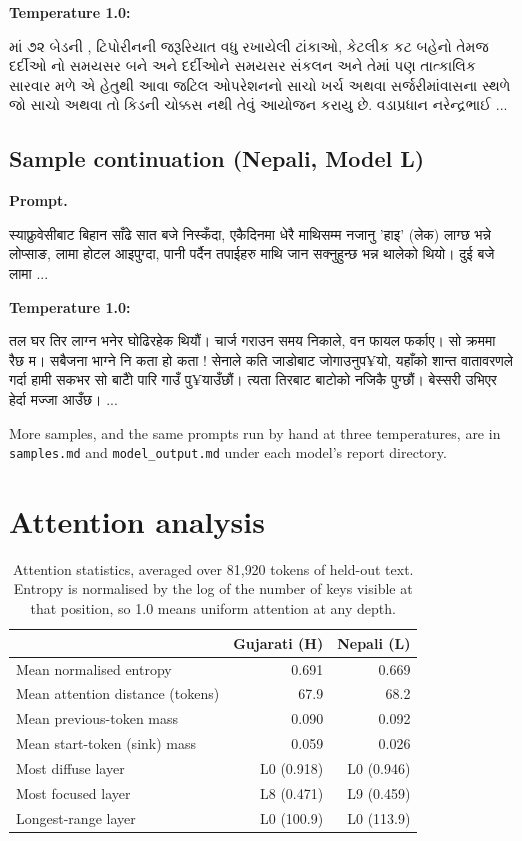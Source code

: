\documentclass[11pt,a4paper]{article}
\newcommand{\gujaratitext}[1]{{\gujaratifont #1}}
\newcommand{\nepalitext}[1]{{\nepalifont #1}}
\newcommand{\fallbacktext}[1]{{\fallbackfont #1}}
\begin{document}
\textbf{Temperature 1.0:} 

\gujaratitext{માં ૭૨ બેડની , ટિપોરીનની જરૂરિયાત વધુ રખાયેલી ટાંકાઓ, કેટલીક કટ બહેનો તેમજ દર્દીઓ નો સમયસર બને અને દર્દીઓને સમયસર સંકલન અને તેમાં પણ તાત્કાલિક સારવાર મળે એ હેતુથી આવા જટિલ ઓપરેશનનો સાચો ખર્ચ અથવા સર્જરીમાંવાસના સ્થળે જો સાચો અથવા તો કિડની ચોક્કસ નથી તેવું આયોજન કરાયુ છે. વડાપ્રધાન નરેન્દ્રભાઈ ...}




\subsection{Sample continuation (Nepali, Model L)}

\textbf{Prompt.} 

\nepalitext{स्याफ्रुवेसीबाट बिहान साँढे सात बजे निस्कँदा, एकैदिनमा धेरै माथिसम्म नजानु 'हाइ' (लेक) लाग्छ भन्ने लोप्साङ, लामा होटल आइपुग्दा, पानी पर्दैन तपाईहरु माथि जान सक्नुहुन्छ भन्न थालेको थियो। दुई बजे लामा ...}





\textbf{Temperature 1.0:} 

\nepalitext{तल घर तिर लाग्न भनेर घोढिरहेक थियौं। चार्ज गराउन समय निकाले, वन फायल फर्काए। सो क्रममा रैछ म। सबैजना भाग्ने नि कता हो कता ! सेनाले कति जाडोबाट जोगाउनुप}\fallbacktext{¥}\nepalitext{यो, यहाँको शान्त वातावरणले गर्दा हामी सकभर सो बाटोै पारि गाउँ पु}\fallbacktext{¥}\nepalitext{याउँछौं। त्यता तिरबाट बाटोको नजिकै पुग्छौं। बेस्सरी उभिएर हेर्दा मज्जा आउँछ। ...}





More samples, and the same prompts run by hand at three
temperatures, are in \texttt{samples.md} and \texttt{model\_output.md} under
each model's report directory.

\section{Attention analysis}

\begin{table}[H]
\centering
\small
\begin{tabular}{lrr}
\toprule
\textbf{} & \textbf{Gujarati (H)} & \textbf{Nepali (L)} \\
\midrule
Mean normalised entropy & 0.691 & 0.669 \\
Mean attention distance (tokens) & 67.9 & 68.2 \\
Mean previous-token mass & 0.090 & 0.092 \\
Mean start-token (sink) mass & 0.059 & 0.026 \\
Most diffuse layer & L0 (0.918) & L0 (0.946) \\
Most focused layer & L8 (0.471) & L9 (0.459) \\
Longest-range layer & L0 (100.9) & L0 (113.9) \\
\bottomrule
\end{tabular}
\caption{Attention statistics, averaged over 81{,}920 tokens of held-out text. Entropy is normalised by the log of the number of keys visible at that position, so 1.0 means uniform attention at any depth.}
\label{tab:attn}
\end{table}
\end{document}
